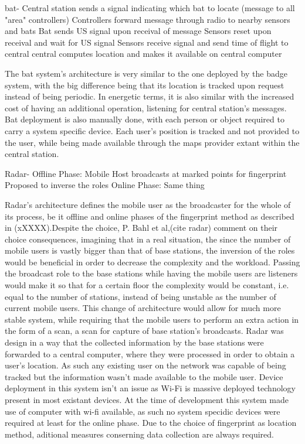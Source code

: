 bat- 		Central station sends a signal indicating which bat to locate (message to all "area" controllers)
			Controllers forward message through radio to nearby sensors and bats
			Bat sends US signal upon receival of message
			Sensors reset upon receival and wait for US signal
			Sensors receive signal and send time of flight to central
			central computes location and makes it available on central computer

The bat system's architecture is very similar to the one deployed by the badge system, with the big difference being that its location is tracked upon request instead of being periodic. In energetic terms, it is also similar with the increased cost of having an additional operation, listening for central station's messages. Bat deployment is also manually done, with each person or object required to carry a system specific device. Each user's position is tracked and not provided to the user, while being made available through the maps provider extant within the central station.


Radar-		Offline Phase:
				Mobile Host broadcasts at marked points for fingerprint
				Proposed to inverse the roles
			Online Phase:
				Same thing


Radar's architecture defines the mobile user as the broadcaster for the whole of its process, be it offline and online phases of the fingerprint method as described in (xXXXX).Despite the choice, P. Bahl et al,(cite radar) comment on their choice consequences, imagining that in a real situation, the since the number of mobile users is vastly bigger than that of base stations, the inversion of the roles would be beneficial in order to decrease the complexity and the workload. Passing the broadcast role to the base stations while having the mobile users are listeners would make it so that for a certain floor the complexity would be constant, i.e. equal to the number of stations, instead of being unstable as the number of current mobile users. This change of architecture would allow for much more stable system, while requiring that the mobile users to perform an extra action in the form of a scan, a scan for capture of base station's broadcasts. Radar was design in a way that the collected information by the base stations were forwarded to a central computer, where they were processed in order to obtain a user's location. As such any existing user on the network was capable of being tracked but the information wasn't made available to the mobile user. Device deployment in this system isn't an issue as Wi-Fi is massive deployed technology present in most existant devices. At the time of development this system made use of computer with wi-fi available, as such no system specidic devices were required at least for the online phase. Due to the choice of fingerprint as location method, aditional measures conserning data collection are always required.

